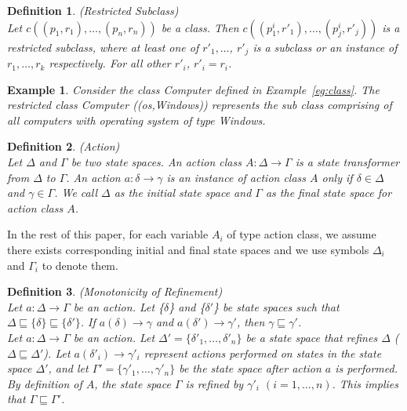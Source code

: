 \documentclass[12pt,journal,letterpaper,onecolumn]{IEEEtran}
\newtheorem{definition}{Definition}[section]
\newtheorem{example}{Example}[section]
\begin{document}
\begin{definition}(Restricted Subclass)\\
Let $c((p_1,r_1),\ldots,(p_n,r_n))$ be a class. Then
$c((p^i_1,r'_1),\ldots,(p^i_j,r'_j))$ is a restricted subclass,
where at least one of $r'_1,\ldots$, $r'_j$ is a subclass or an
instance of $r_1,\ldots,r_k$ respectively. For all other $r'_i$,
$r'_i=r_i$. \label{def:RestrictedSubclass}
\end{definition}

\begin{example}  Consider the class {\ttfamily Computer} defined
in Example~\ref{eg:class}. The restricted class {\ttfamily
Computer} {\ttfamily((os,Windows))} represents the sub class comprising of all
computers with operating system of type {\ttfamily Windows}.
\end{example}


\begin{definition}(Action)\\
\label{def:action} Let $\Delta$ and $\Gamma$ be two state spaces. An
action class $A: \Delta \rightarrow \Gamma$ is a state transformer
from $\Delta$ to $\Gamma$. An action $a:\delta \rightarrow \gamma$
is an instance of action class $A$ only if $\delta \in \Delta$ and
$\gamma \in \Gamma$. We call $\Delta$ as the initial state space and
$\Gamma$ as the final state space for action class $A$.
\end{definition}

In the rest of this paper, for each variable $A_i$ of type action class,
 we assume there exists corresponding initial and final state spaces
 and we use symbols $\Delta_i$ and $\Gamma_i$ to denote them.

\begin{definition}(Monotonicity of Refinement)\\
\label{def:monotonicity}
Let $a:\Delta \rightarrow \Gamma$ be an action. Let \{$\delta$\} and
\{$\delta'$\} be state spaces such that
$\Delta \sqsubseteq \{\delta\} \sqsubseteq \{\delta'\}$. If
$a(\delta) \rightarrow \gamma$ and $a(\delta') \rightarrow \gamma'$,
then $\gamma \sqsubseteq \gamma'$.\\

Let $a:\Delta\rightarrow\Gamma$ be an action.
Let $\Delta'=\{\delta'_1,\ldots,\delta'_n\}$ be a state space that
refines $\Delta$ ($\Delta \sqsubseteq \Delta'$).
Let $a(\delta'_i) \rightarrow \gamma'_i$ represent actions performed
 on states in the state space $\Delta'$, and let
 $\Gamma' = \{\gamma'_1, \ldots, \gamma'_n\}$ be the state space
 after action $a$ is performed.  By definition of $A$, the state
 space $\Gamma$ is refined by $\gamma'_i$ $(i=1,\ldots,n)$. This
 implies that $\Gamma \sqsubseteq \Gamma'$.

\end{definition}
\end{document}
